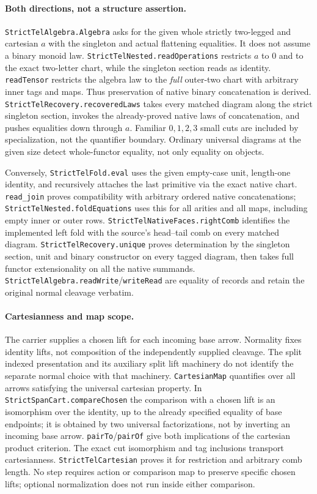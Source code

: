 \documentclass[11pt]{article}
\newcommand{\code}[1]{\texttt{#1}}
\begin{document}
\paragraph{Both directions, not a structure assertion.}
\code{StrictTelAlgebra.Algebra} asks for the given whole strictly two-legged and cartesian \(a\) with the singleton and actual flattening equalities. It does not assume a binary monoid law. \code{StrictTelNested.readOperations} restricts \(a\) to \(0\) and to the exact two-letter chart, while the singleton section reads as identity. \code{readTensor} restricts the algebra law to the \emph{full} outer-two chart with arbitrary inner tags and maps. Thus preservation of native binary concatenation is derived. \code{StrictTelRecovery.recoveredLaws} takes every matched diagram along the strict singleton section, invokes the already-proved native laws of concatenation, and pushes equalities down through \(a\). Familiar \(0,1,2,3\) small cuts are included by specialization, not the quantifier boundary. Ordinary universal diagrams at the given size detect whole-functor equality, not only equality on objects.

Conversely, \code{StrictTelFold.eval} uses the given empty-case unit, length-one identity, and recursively attaches the last primitive via the exact native chart. \code{read\_join} proves compatibility with arbitrary ordered native concatenations; \code{StrictTelNested.foldEquations} uses this for all arities and all maps, including empty inner or outer rows. \code{StrictTelNativeFaces.rightComb} identifies the implemented left fold with the source's head--tail comb on every matched diagram. \code{StrictTelRecovery.unique} proves determination by the singleton section, unit and binary constructor on every tagged diagram, then takes full functor extensionality on all the native summands. \code{StrictTelAlgebra.readWrite}/\code{writeRead} are equality of records and retain the original normal cleavage verbatim.

\paragraph{Cartesianness and map scope.}
The carrier supplies a chosen lift for each incoming base arrow. Normality fixes identity lifts, not composition of the independently supplied cleavage. The split indexed presentation and its auxiliary split lift machinery do not identify the separate normal choice with that machinery. \code{CartesianMap} quantifies over all arrows satisfying the universal cartesian property. In \code{StrictSpanCart.compareChosen} the comparison with a chosen lift is an isomorphism over the identity, up to the already specified equality of base endpoints; it is obtained by two universal factorizations, not by inverting an incoming base arrow. \code{pairTo}/\code{pairOf} give both implications of the cartesian product criterion. The exact cut isomorphism and tag inclusions transport cartesianness. \code{StrictTelCartesian} proves it for restriction and arbitrary comb length. No step requires action or comparison map to preserve specific chosen lifts; optional normalization does not run inside either comparison.
\end{document}
